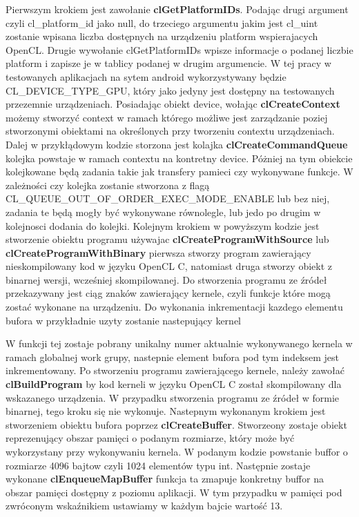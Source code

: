 Pierwszym krokiem jest zawołanie \textbf{clGetPlatformIDs}. Podając drugi argument czyli cl\_platform\_id\* jako null, do trzeciego argumentu jakim jest cl\_uint\* zostanie wpisana liczba dostępnych na urządzeniu platform wspierajacych OpenCL.
Drugie wywołanie clGetPlatformIDs wpisze informacje o podanej liczbie platform i zapisze je w tablicy podanej w drugim argumencie.
W tej pracy w testowanych aplikacjach na sytem android wykorzystywany będzie CL\_DEVICE\_TYPE\_GPU, który jako jedyny jest dostępny na testowanych przezemnie urządzeniach.
Posiadając obiekt device, wołając \textbf{clCreateContext} możemy stworzyć context w ramach którego możliwe jest zarządzanie poziej stworzonymi obiektami na określonych przy tworzeniu contextu urządzeniach. 
Dalej w przykłądowym kodzie storzona jest kolajka \textbf{clCreateCommandQueue} kolejka powstaje w ramach contextu na kontretny device. Póżniej na tym obiekcie kolejkowane będą zadania takie jak transfery pamieci czy wykonywane funkcje. W zależności czy kolejka zostanie stworzona z flagą CL\_QUEUE\_OUT\_OF\_ORDER\_EXEC\_MODE\_ENABLE lub bez niej, zadania te będą mogły być wykonywane równolegle, lub jedo po drugim w kolejnosci dodania do kolejki.
Kolejnym krokiem w powyższym kodzie jest stworzenie obiektu programu używajac \textbf{clCreateProgramWithSource} lub \textbf{clCreateProgramWithBinary} pierwsza stworzy program zawierający nieskompilowany kod w języku OpenCL C, natomiast druga stworzy obiekt z binarnej wersji, wcześniej skompilowanej. Do stworzenia programu ze źródeł przekazywany jest ciąg znaków zawierający kernele, czyli funkcje które mogą zostać wykonane na urządzeniu.
Do wykonania inkrementacji kazdego elementu bufora w przykładnie uzyty zostanie nastepujący kernel

W funkcji tej zostaje pobrany unikalny numer aktualnie wykonywanego kernela w ramach globalnej work grupy, nastepnie element bufora pod tym indeksem jest inkrementowany. 
Po stworzeniu programu zawierającego kernele, należy zawołać \textbf{clBuildProgram} by kod kerneli w języku OpenCL C został skompilowany dla wskazanego urządzenia. W przypadku stworzenia programu ze źródeł w formie binarnej, tego kroku się nie wykonuje.
Nastepnym wykonanym krokiem jest stworzeniem obiektu bufora poprzez \textbf{clCreateBuffer}. Stworzeony zostaje obiekt reprezenujący obszar pamięci o podanym rozmiarze, który może być wykorzystany przy wykonywaniu kernela. W podanym kodzie powstanie buffor o rozmiarze 4096 bajtow czyli 1024 elementów typu int.
Następnie zostaje wykonane \textbf{clEnqueueMapBuffer} funkcja ta zmapuje konkretny buffor na obszar pamięci dostępny z poziomu aplikacji. W tym przypadku w pamięci pod zwróconym wskaźnikiem ustawiamy w każdym bajcie wartość 13.
